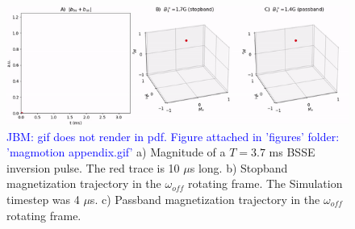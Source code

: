 \begin{figure}[h]
\centering
\includegraphics[width=1.1\textwidth]{figures/magmotion_appendix.gif}
\caption{\textcolor{blue}{JBM: gif does not render in pdf. Figure attached in 'figures' folder: 'magmotion appendix.gif'} a) Magnitude of a $T = 3.7$ ms BSSE inversion pulse. 
The red trace is 10 $\mu$s long. 
b) Stopband magnetization trajectory in the $\omega_{off}$ rotating frame. 
The Simulation timestep was 4 $\mu$s.
c) Passband magnetization trajectory in the $\omega_{off}$ rotating frame.}
\label{fig:magmotion_animated}
\end{figure}
